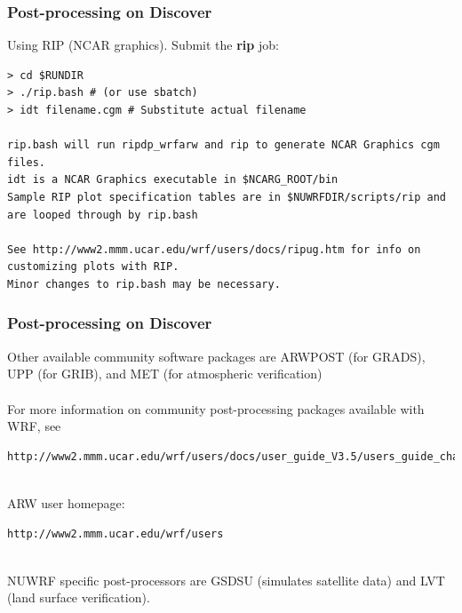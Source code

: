 \begin{frame}[fragile]
\frametitle{Post-processing on Discover}

Using RIP (NCAR graphics). Submit the \textbf{rip} job:
\begin{lstlisting}
> cd $RUNDIR
> ./rip.bash # (or use sbatch)
> idt filename.cgm # Substitute actual filename

rip.bash will run ripdp_wrfarw and rip to generate NCAR Graphics cgm files.
idt is a NCAR Graphics executable in $NCARG_ROOT/bin
Sample RIP plot specification tables are in $NUWRFDIR/scripts/rip and are looped through by rip.bash

See http://www2.mmm.ucar.edu/wrf/users/docs/ripug.htm for info on customizing plots with RIP. 
Minor changes to rip.bash may be necessary.
\end{lstlisting}

\end{frame}

\begin{frame}[fragile]
\frametitle{Post-processing on Discover}

Other available community software packages are ARWPOST (for GRADS), UPP (for GRIB), and MET (for atmospheric verification)\\
\mbox{}\\
For more information on community post-processing packages available with WRF, see \\
\begin{lstlisting}
http://www2.mmm.ucar.edu/wrf/users/docs/user_guide_V3.5/users_guide_chap9.htm
\end{lstlisting}
\mbox{}\\
ARW user homepage:\\  
\begin{lstlisting}
http://www2.mmm.ucar.edu/wrf/users
\end{lstlisting}
\mbox{}\\
NUWRF specific post-processors are GSDSU (simulates satellite data) and LVT (land surface verification).

\end{frame}

